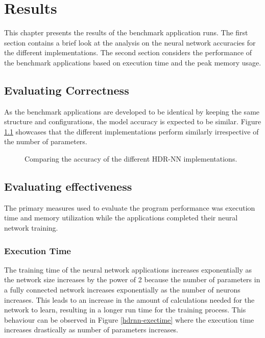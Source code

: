 
\chapter{Results}

This chapter presents the results of the benchmark application runs. The first section contains a brief look at the analysis on the neural network accuracies for the different implementations. The second section considers the performance of the benchmark applications based on execution time and the peak memory usage.

\section{Evaluating Correctness}

As the benchmark applications are developed to be identical by keeping the same structure and configurations, the model accuracy is expected to be similar. Figure \ref{hdrnn-accuracy} showcases that the different implementations perform similarly irrespective of the number of parameters.

\begin{figure}[!ht]
	\centering
	
	\caption[HDR-NN Accuracy]{Comparing the accuracy of the different HDR-NN implementations.}
	\label{hdrnn-accuracy}
\end{figure}

\section{Evaluating effectiveness}

The primary measures used to evaluate the program performance was execution time and memory utilization while the applications completed their neural network training.

\subsection{Execution Time}

The training time of the neural network applications increases exponentially as the network size increases by the power of 2 because the number of parameters in a fully connected network increases exponentially as the number of neurons increases. This leads to an increase in the amount of calculations needed for the network to learn, resulting in a longer run time for the training process. This behaviour can be observed in Figure \ref{hdrnn-exectime} where the execution time increases drastically as number of parameters increases.

